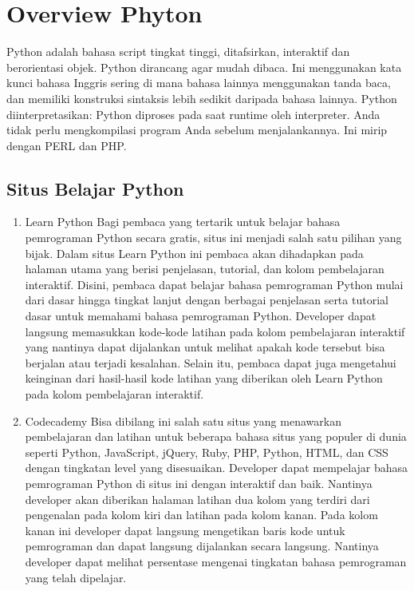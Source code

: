\section{Overview Phyton}
Python adalah bahasa script tingkat tinggi, ditafsirkan,
interaktif dan berorientasi objek. Python dirancang agar
mudah dibaca. Ini menggunakan kata kunci bahasa Inggris
sering di mana bahasa lainnya menggunakan tanda baca,
dan memiliki konstruksi sintaksis lebih sedikit daripada
bahasa lainnya.
Python diinterpretasikan: Python diproses pada saat runtime
oleh interpreter. Anda tidak perlu mengkompilasi program
Anda sebelum menjalankannya. Ini mirip dengan PERL dan
PHP.
\subsection{Situs Belajar Python} 
\begin{enumerate}
\item Learn Python
Bagi pembaca yang tertarik untuk belajar bahasa pemrograman
Python secara gratis, situs ini menjadi salah satu pilihan
yang bijak. Dalam situs Learn Python ini pembaca akan
dihadapkan pada halaman utama yang berisi penjelasan,
tutorial, dan kolom pembelajaran interaktif.
Disini, pembaca dapat belajar bahasa pemrograman Python
mulai dari dasar hingga tingkat lanjut dengan berbagai penjelasan
serta tutorial dasar untuk memahami bahasa pemrograman
Python. Developer dapat langsung memasukkan
kode-kode latihan pada kolom pembelajaran interaktif yang
nantinya dapat dijalankan untuk melihat apakah kode tersebut
bisa berjalan atau terjadi kesalahan.
Selain itu, pembaca dapat juga mengetahui keinginan dari
hasil-hasil kode latihan yang diberikan oleh Learn Python
pada kolom pembelajaran interaktif.

\item Codecademy
Bisa dibilang ini salah satu situs yang menawarkan pembelajaran 
dan latihan untuk beberapa bahasa situs yang 
populer di dunia seperti Python, JavaScript, jQuery, Ruby, 
PHP, Python, HTML, dan CSS dengan tingkatan level yang 
disesuaikan. 
Developer dapat mempelajar bahasa pemrograman Python 
di situs ini dengan interaktif dan baik. Nantinya developer 
akan diberikan halaman latihan dua kolom yang terdiri dari 
pengenalan pada kolom kiri dan latihan pada kolom kanan. 
Pada kolom kanan ini developer dapat langsung mengetikan 
baris kode untuk pemrograman dan dapat langsung dijalankan 
secara langsung. Nantinya developer dapat melihat 
persentase mengenai tingkatan bahasa pemrograman yang 
telah dipelajar.


\end{enumerate}
